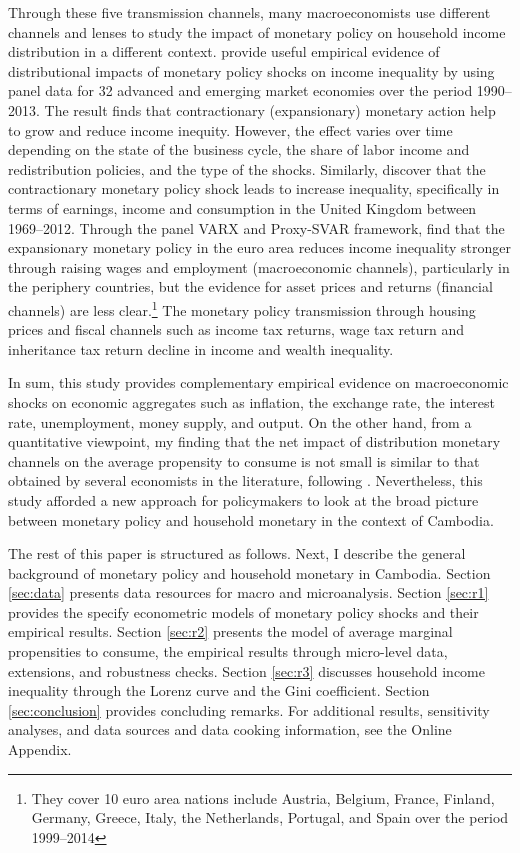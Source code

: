 \documentclass[11pt,letterpaper]{article}
\begin{document}
Through these five transmission channels, many macroeconomists use different channels and lenses to study the impact of monetary policy on household income distribution in a different context. \citet{Furceri2016} provide useful empirical evidence of distributional impacts of monetary policy shocks on income inequality by using panel data for 32 advanced and emerging market economies over the period 1990--2013. The result finds that contractionary (expansionary) monetary action help to grow and reduce income inequity. However, the effect varies over time depending on the state of the business cycle, the share of labor income and redistribution policies, and the type of the shocks. Similarly, \citet{Mumtaz2017} discover that the contractionary monetary policy shock leads to increase inequality, specifically in terms of earnings, income and consumption in the United Kingdom between 1969--2012. Through the panel VARX and Proxy-SVAR framework, \citet{Samarina2019} find that the expansionary monetary policy in the euro area reduces income inequality stronger through raising wages and employment (macroeconomic channels), particularly in the periphery countries, but the evidence for asset prices and returns (financial channels) are less clear.\footnote{They cover 10 euro area nations include Austria, Belgium, France, Finland, Germany, Greece, Italy, the Netherlands, Portugal, and Spain over the period 1999--2014} The monetary policy transmission through housing prices and fiscal channels such as income tax returns, wage tax return and inheritance tax return \cite{Albert2020, Piketty2003} decline in income and wealth inequality.  

In sum, this study provides complementary empirical evidence on macroeconomic shocks on economic aggregates such as inflation, the exchange rate, the interest rate, unemployment, money supply, and output. On the other hand, from a quantitative viewpoint, my finding that the net impact of distribution monetary channels on the average propensity to consume is not small is similar to that obtained by several economists in the literature, following \citet{Auclert2019, Coibion2017, Kaplan2018, Romer2004}. Nevertheless, this study afforded a new approach for policymakers to look at the broad picture between monetary policy and household monetary in the context of Cambodia.  

The rest of this paper is structured as follows. Next, I describe the general background of monetary policy and household monetary in Cambodia. Section \ref{sec:data} presents data resources for macro and microanalysis. Section \ref{sec:r1} provides the specify econometric models of monetary policy shocks and their empirical results. Section \ref{sec:r2} presents the model of average marginal propensities to consume, the empirical results through micro-level data, extensions, and robustness checks. Section \ref{sec:r3} discusses household income inequality through the Lorenz curve and the Gini coefficient. Section \ref{sec:conclusion} provides concluding remarks. For additional results, sensitivity analyses, and data sources and data cooking information, see the Online Appendix. 
\end{document}
